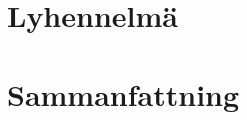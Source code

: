 

\chapter*{Lyhennelmä}\label{app:extended-fi}
\begin{otherlanguage}{finnish}
\end{otherlanguage}

\chapter*{Sammanfattning}\label{app:extended-sv}
\begin{otherlanguage}{swedish}
\end{otherlanguage}
